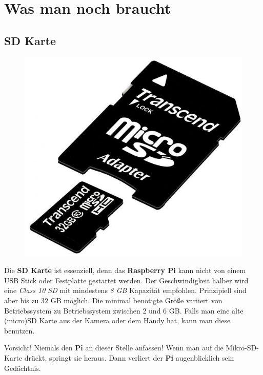 \documentclass[12pt,a4paper]{article}
\newcommand{\rp}{\textbf{Raspberry Pi}\xspace}
\begin{document}
\section{Was man noch braucht}
\label{sec:acc}

\subsection{SD Karte}

\begin{figure}
  \vspace{-25pt}
  \begin{center}
    \includegraphics[scale=0.2]{sd_card}
  \end{center}
  \vspace{-25pt}
\end{figure}

Die \textbf{SD Karte} ist essenziell, denn das \rp kann nicht von einem USB Stick oder Festplatte gestartet werden. Der Geschwindigkeit halber wird eine \textit{Class 10 SD} mit mindestens \textit{8 GB} Kapazität empfohlen. Prinzipiell sind aber bis zu 32 GB möglich. Die minimal benötigte Größe variiert von Betriebssystem zu Betriebssystem zwischen 2 und 6 GB. Falls man eine alte (micro)SD Karte aus der Kamera oder dem Handy hat, kann man diese benutzen.

Vorsicht! Niemals den \textbf{Pi} an dieser Stelle anfassen! Wenn man auf die Mikro-SD-Karte drückt, springt sie heraus. Dann verliert der \textbf{Pi} augenblicklich sein Gedächtnis. 
\end{document}
